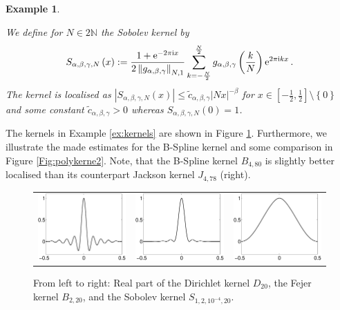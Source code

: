 \documentclass[11pt,a4paper,bibtotoc]{scrartcl}
\def\N{\mathbb{N}}
\def\ti{\mbox{\scriptsize{\rm i}}}
\newcommand{\eip}[1]{{\rm e}^{ 2\pi{\ti} #1}}
\newcommand{\eim}[1]{{\rm e}^{-2\pi{\ti} #1}}
\newtheorem{example}[theorem]{Example}
\newenvironment{Example}{\goodbreak \begin{example}\rm}{\end{example}}
\numberwithin{equation}{section}
\numberwithin{table}{section}
\numberwithin{figure}{section}
\begin{document}
\begin{Example}
\begin{enumerate}
  We define for $N\in2\N$ the Sobolev kernel by
  \begin{equation*}
    S_{\alpha,\beta,\gamma,N}\left(x\right)
    :=\frac{1+\eim{x}}{2\left\|g_{\alpha,\beta,\gamma}\right\|_{N,1}}
    \sum_{k=-\frac{N}{2}}^{\frac{N}{2}}
    g_{\alpha,\beta,\gamma}\left(\frac{k}{N}\right)
   \eip{kx}\,.
  \end{equation*}
  The kernel is localised as $|S_{\alpha,\beta,\gamma,N}(x)| \le \tilde
  c_{\alpha,\beta,\gamma} |Nx|^{-\beta}$ for
  $x\in\left[-\frac{1}{2},\frac{1}{2}\right] \setminus\left\{0\right\}$
  and some constant $\tilde c_{\alpha,\beta,\gamma}>0$ whereas
  $S_{\alpha,\beta,\gamma,N}\left(0\right)=1$.
\end{enumerate}
\end{Example}

The kernels in Example \ref{ex:kernels} are shown in Figure
\ref{Fig:polykerne}.
Furthermore, we illustrate the made estimates for the B-Spline kernel and some
comparison in Figure \ref{Fig:polykerne2}.
Note, that the B-Spline kernel $B_{4,80}$ is slightly better localised than
its counterpart Jackson kernel $J_{4,78}$ (right).
\begin{figure}[ht]
  \begin{center}
    \begin{tabular}{ccc}
      \includegraphics[width=4cm]{images/polynomial_kernels1.eps} &
      \includegraphics[width=4cm]{images/polynomial_kernels2.eps} &
      \includegraphics[width=4cm]{images/polynomial_kernels4.eps}
    \end{tabular}
  \end{center}
  \caption{From left to right: Real part of the Dirichlet kernel $D_{20}$, the
    Fejer kernel $B_{2,20}$, and the Sobolev kernel
    $S_{1,2,10^{-4},20}$. \label{Fig:polykerne}}
\end{figure}
\end{document}
